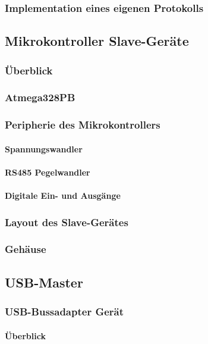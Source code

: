 \subsubsection{Implementation eines eigenen Protokolls}

\subsection{Mikrokontroller Slave-Geräte}
\subsubsection{Überblick}
\subsubsection{Atmega328PB}
\subsubsection{Peripherie des Mikrokontrollers}
\paragraph{Spannungswandler}
\paragraph{RS485 Pegelwandler}
\paragraph{Digitale Ein- und Ausgänge}
\subsubsection{Layout des Slave-Gerätes}
\subsubsection{Gehäuse}


\subsection{USB-Master}
\subsubsection{USB-Bussadapter Gerät}
\paragraph{Überblick}
